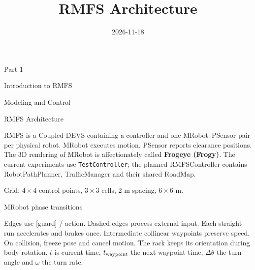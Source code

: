 
\usetikzlibrary{decorations.pathreplacing}
\title{RMFS Architecture}
\date{2026-11-18}


\begin{frame}[plain]
\centering
{\color{accent}\LARGE Part 1\par}\vspace{8mm}
{\LARGE Introduction to RMFS\par Modeling and Control\par}
\end{frame}


\begin{frame}{RMFS Architecture}

\begin{center}
\end{center}

\small RMFS is a Coupled DEVS containing a controller and one MRobot--PSensor pair per physical robot.
MRobot executes motion. PSensor reports clearance positions. The 3D rendering of MRobot is affectionately called \textbf{Frogeye (Frogy)}.
The current experiments use \texttt{TestController}; the planned RMFSController contains
RobotPathPlanner, TrafficManager and their shared RoadMap.\par\smallskip Grid: $4\times4$ control points, $3\times3$ cells, 2 m spacing, $6\times6$ m.
\end{frame}

\begin{frame}{MRobot phase transitions}
\centering\resizebox{.95\linewidth}{!}{\MRobotDiagram}
\par\medskip\raggedright\small
Edges use [guard] / action. Dashed edges process external input.
Each straight run accelerates and brakes once. Intermediate collinear waypoints preserve speed.
On collision, freeze pose and cancel motion. The rack keeps its orientation during body rotation.
{\scriptsize $t$ is current time, $t_{\rm waypoint}$ the next waypoint time, $\Delta\theta$ the turn angle and $\omega$ the turn rate.}
\end{frame}


